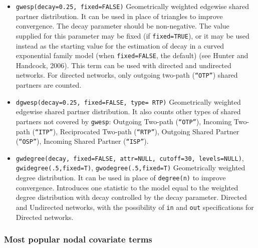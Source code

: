 \documentclass[
]{article}
\begin{document}
\begin{itemize}
\item
  \texttt{gwesp(decay=0.25,\ fixed=FALSE)} Geometrically weighted
  edgewise shared partner distribution. It can be used in place of
  triangles to improve convergence. The decay parameter should be
  non-negative. The value supplied for this parameter may be fixed (if
  \texttt{fixed=TRUE}), or it may be used instead as the starting value
  for the estimation of decay in a curved exponential family model (when
  \texttt{fixed=FALSE}, the default) (see Hunter and Handcock, 2006).
  This term can be used with directed and undirected networks. For
  directed networks, only outgoing two-path (\texttt{“OTP”}) shared
  partners are counted.
\item
  \texttt{dgwesp(decay=0.25,\ fixed=FALSE,\ type=\ \textquotesingle{}RTP\textquotesingle{})}
  Geometrically weighted edgewise shared partner distribution. It also
  counts other types of shared partners not covered by \texttt{gwesp}:
  Outgoing Two-path (\texttt{“OTP”}), Incoming Two-path
  (\texttt{“ITP”}), Reciprocated Two-path (\texttt{“RTP”}), Outgoing
  Shared Partner (\texttt{“OSP”}), Incoming Shared Partner
  (\texttt{“ISP”}).
\item
  \texttt{gwdegree(decay,\ fixed=FALSE,\ attr=NULL,\ cutoff=30,\ levels=NULL)},
  \texttt{gwidegree(.5,fixed=T)}, \texttt{gwodegree(.5,fixed=T)}
  Geometrically weighted degree distribution. It can be used in place of
  \texttt{degree(n)} to improve convergence. Introduces one statistic to
  the model equal to the weighted degree distribution with decay
  controlled by the decay parameter. Directed and Undirected networks,
  with the possibility of \texttt{in} and \texttt{out} specifications
  for Directed networks.
\end{itemize}

\hypertarget{most-popular-nodal-covariate-terms}{%
\subsubsection{Most popular nodal covariate
terms}\label{most-popular-nodal-covariate-terms}}
\end{document}
